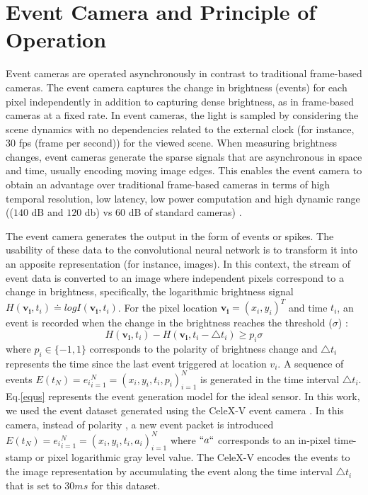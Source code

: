 \documentclass[journal]{IEEEtran}
\begin{document}
\section{Event Camera and Principle of Operation}
Event cameras are operated asynchronously in contrast to traditional frame-based cameras. The event camera captures the change in brightness (events) for each pixel independently in addition to capturing dense brightness, as in frame-based cameras at a fixed rate. In event cameras, the light is sampled by considering the scene dynamics with no dependencies related to the external clock (for instance, 30 fps (frame per second)) for the viewed scene. When measuring brightness changes, event cameras generate the sparse signals that are asynchronous in space and time, usually encoding moving image edges. This enables the event camera to obtain an advantage over traditional frame-based cameras in terms of high temporal resolution, low latency, low power computation and high dynamic range (($140$ dB and $120$ db) vs $60$ dB of standard cameras) \cite{Gallego2019} \cite{r2}.  
\par
The event camera generates the output in the form of events or spikes. The usability of these data to the convolutional neural network is to transform it into an apposite representation (for instance, images). In this context, the stream of event data is converted to an image where independent pixels correspond to a change in brightness, specifically, the logarithmic brightness signal $H(\mathbf{v_i},t_i)\doteq log I(\mathbf{v_i},t_i)$. For the pixel location $\mathbf{v_i}=(x_i,y_i)^T$ and time $t_i$, an event is recorded when the change in the brightness reaches the threshold ($\sigma$) \cite{r3}: 
\begin{equation}
\label{equs}
 H(\mathbf{v_i},t_i)-H(\mathbf{v_i},t_i-\triangle t_i)\geq p_i\sigma
\end{equation}
where $p_i \in {\{-1,1\}}$ corresponds to the polarity of brightness change and $\triangle t_i$ represents the time since the last event triggered at location $v_i$. A sequence of events $E(t_N)={e_i}_{i=1}^{N}={(x_i,y_i,t_i,p_i)}_{i=1}^{N}$ is generated in the time interval $\triangle t_i$. Eq.\ref{equs} represents the event generation model for the ideal sensor. In this work, we used the event dataset generated using the CeleX-V event camera \cite{r4}. In this camera, instead of polarity , a new event packet is introduced $E(t_N)={e_i}_{i=1}^{N}={(x_i,y_i,t_i,a_i)}_{i=1}^{N}$ where $``a``$ corresponds to an in-pixel time-stamp or pixel logarithmic gray level value. The CeleX-V encodes the events to the image representation by accumulating the event along the time interval $\triangle t_i$ that is set to $30 ms$ for this dataset.  
\end{document}
